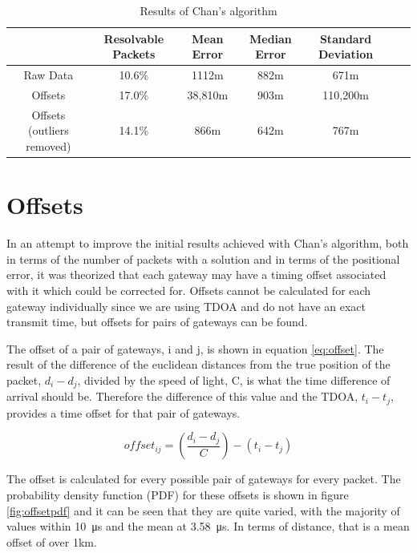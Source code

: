 \documentclass[a4paper]{report}
\begin{document}
    \begin{table}[ht]
      \begin{center}
        \caption{Results of Chan's algorithm}
        \label{tab:chanresults}
        \begin{tabular}{|c|c|c|c|c|c|c|}
          \hline
           & Resolvable Packets & Mean Error & Median Error & Standard Deviation \\
          \hline
          Raw Data & 10.6\% & 1112m & 882m & 671m \\
          \hline
          Offsets & 17.0\% & 38,810m & 903m & 110,200m \\
          \hline
          Offsets (outliers removed) & 14.1\% & 866m & 642m & 767m \\
          \hline
        \end{tabular}
      \end{center}
    \end{table}

  \section{Offsets}

    In an attempt to improve the initial results achieved with Chan's algorithm, both in terms of the number of packets with a solution and in terms of the positional error, it was theorized that each gateway may have a timing offset associated with it which could be corrected for. Offsets cannot be calculated for each gateway individually since we are using TDOA and do not have an exact transmit time, but offsets for pairs of gateways can be found.

    The offset of a pair of gateways, i and j, is shown in equation \ref{eq:offset}. The result of the difference of the euclidean distances from the true position of the packet, \(d_i - d_j\), divided by the speed of light, C, is what the time difference of arrival should be. Therefore the difference of this value and the TDOA, \(t_i - t_j\), provides a time offset for that pair of gateways.

    \begin{equation}
    \label{eq:offset}
    offset_{ij} = (\frac{d_i - d_j}{C}) - (t_i - t_j)
    \end{equation}

    The offset is calculated for every possible pair of gateways for every packet. The probability density function (PDF) for these offsets is shown in figure \ref{fig:offsetpdf} and it can be seen that they are quite varied, with the majority of values within \SI{10}{\micro\second} and the mean at \SI{3.58}{\micro\second}. In terms of distance, that is a mean offset of over 1km.
\end{document}
